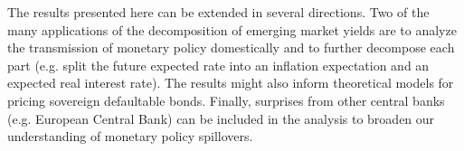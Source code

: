 {The results presented here can be extended in several directions.
Two of the many applications of the decomposition of emerging market yields are to analyze the transmission of monetary policy domestically and to further decompose each part (e.g. split the future expected rate into an inflation expectation and an expected real interest rate).
The results might also inform theoretical models for pricing sovereign defaultable bonds. 
Finally, surprises from other central banks (e.g. European Central Bank) can be included in the analysis to broaden our understanding of monetary policy spillovers.





}
